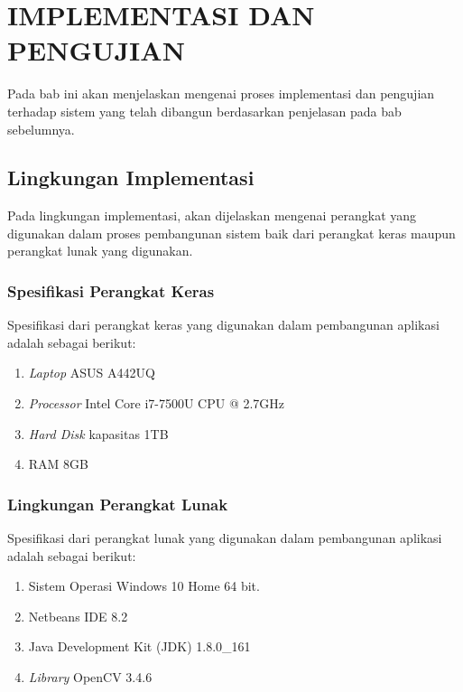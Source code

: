 \chapter{IMPLEMENTASI DAN PENGUJIAN}

%
\vspace{4.5pt}
\noindent Pada bab ini akan menjelaskan mengenai proses implementasi dan pengujian terhadap sistem yang telah dibangun berdasarkan penjelasan pada bab sebelumnya.\\

\section{Lingkungan Implementasi}
\noindent Pada lingkungan implementasi, akan dijelaskan mengenai perangkat yang digunakan dalam proses pembangunan sistem baik dari perangkat keras maupun perangkat lunak yang digunakan.\\

\subsection{Spesifikasi Perangkat Keras}
\noindent Spesifikasi dari perangkat keras yang digunakan dalam pembangunan aplikasi adalah sebagai berikut:
\begin{enumerate}
\item \textit{Laptop} ASUS A442UQ
\item \textit{Processor} Intel Core i7-7500U CPU @ 2.7GHz
\item \textit{Hard Disk} kapasitas 1TB
\item RAM 8GB\\
\end{enumerate}

\subsection{Lingkungan Perangkat Lunak}
\noindent Spesifikasi dari perangkat lunak yang digunakan dalam pembangunan aplikasi adalah sebagai berikut:
\begin{enumerate}
\item Sistem Operasi Windows 10 Home 64 bit.
\item Netbeans IDE 8.2
\item Java Development Kit (JDK) 1.8.0{\_}161
\item \textit{Library} OpenCV 3.4.6\\
\end{enumerate}

